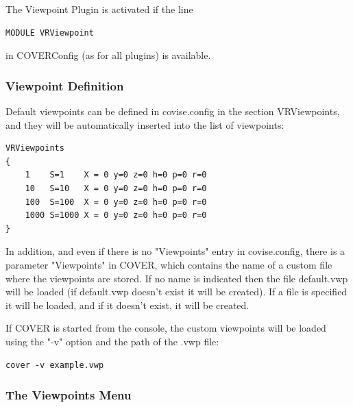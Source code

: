 The Viewpoint Plugin is activated if the line  
\begin{verbatim}
MODULE VRViewpoint
\end{verbatim}
in COVERConfig (as for all plugins) is available.

\subsubsection{Viewpoint Definition}

Default viewpoints can be defined in covise.config in
the section VRViewpoints, and they will be automatically inserted into the
list of viewpoints:

\begin{verbatim}
VRViewpoints
{
    1    S=1    X = 0 y=0 z=0 h=0 p=0 r=0
    10   S=10   X = 0 y=0 z=0 h=0 p=0 r=0
    100  S=100  X = 0 y=0 z=0 h=0 p=0 r=0
    1000 S=1000 X = 0 y=0 z=0 h=0 p=0 r=0
}
\end{verbatim}

In addition, and even if there is no "Viewpoints" entry in covise.config, there
is a parameter "Viewpoints" in COVER, which contains the name of a custom file
where the viewpoints are stored. If no name is indicated then the file
default.vwp will be loaded (if default.vwp doesn't exist it will be
created).
If a file is specified it will be loaded, and if it doesn't
exist, it will be created.

If COVER is started from the console, the custom viewpoints will be loaded
using  the "-v" option and the path of the .vwp file:
\begin{verbatim}
cover -v example.vwp 
\end{verbatim}


\subsubsection{The Viewpoints Menu}

